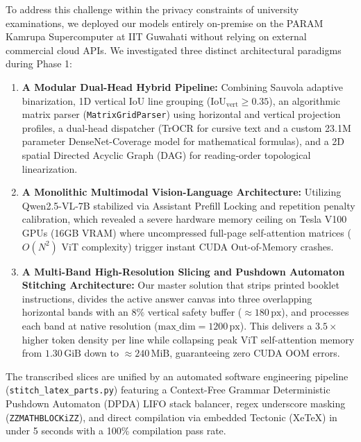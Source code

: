 \documentclass[12pt,a4paper]{report}
\theoremstyle{plain}
\theoremstyle{definition}
\theoremstyle{remark}
\begin{document}
To address this challenge within the privacy constraints of university examinations, we deployed our models entirely on-premise on the PARAM Kamrupa Supercomputer at IIT Guwahati without relying on external commercial cloud APIs. We investigated three distinct architectural paradigms during Phase 1:
\begin{enumerate}[label=(\alph*)]
    \item \textbf{A Modular Dual-Head Hybrid Pipeline:} Combining Sauvola adaptive binarization, 1D vertical IoU line grouping ($\text{IoU}_{\text{vert}} \ge 0.35$), an algorithmic matrix parser (\texttt{MatrixGridParser}) using horizontal and vertical projection profiles, a dual-head dispatcher (TrOCR for cursive text and a custom 23.1M parameter DenseNet-Coverage model for mathematical formulas), and a 2D spatial Directed Acyclic Graph (DAG) for reading-order topological linearization.
    \item \textbf{A Monolithic Multimodal Vision-Language Architecture:} Utilizing Qwen2.5-VL-7B stabilized via Assistant Prefill Locking and repetition penalty calibration, which revealed a severe hardware memory ceiling on Tesla V100 GPUs (16GB VRAM) where uncompressed full-page self-attention matrices ($O(N^2)$ ViT complexity) trigger instant CUDA Out-of-Memory crashes.
    \item \textbf{A Multi-Band High-Resolution Slicing and Pushdown Automaton Stitching Architecture:} Our master solution that strips printed booklet instructions, divides the active answer canvas into three overlapping horizontal bands with an $8\%$ vertical safety buffer ($\approx 180\,\text{px}$), and processes each band at native resolution ($\text{max\_dim} = 1200\,\text{px}$). This delivers a $3.5\times$ higher token density per line while collapsing peak ViT self-attention memory from $1.30\,\text{GiB}$ down to $\approx 240\,\text{MiB}$, guaranteeing zero CUDA OOM errors.
\end{enumerate}

The transcribed slices are unified by an automated software engineering pipeline (\texttt{stitch\_latex\_parts.py}) featuring a Context-Free Grammar Deterministic Pushdown Automaton (DPDA) LIFO stack balancer, regex underscore masking (\texttt{ZZMATHBLOCKiZZ}), and direct compilation via embedded Tectonic (XeTeX) in under 5 seconds with a 100\% compilation pass rate. 
\end{document}
